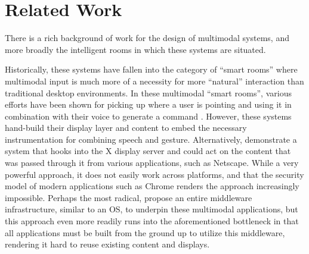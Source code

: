 \section{Related Work}

There is a rich background of work for the design of multimodal systems, and more broadly the intelligent rooms
in which these systems are situated.

Historically, these systems have fallen into the category of ``smart rooms''
where multimodal input is much more of a necessity for more ``natural''
interaction than traditional desktop environments. In these multimodal
``smart rooms'', various efforts have been shown for picking up
where a user is pointing and using it in combination with
their voice to generate a command
\cite{bolt_put-that-there:_1980,carbini_wizard_2006,langner_multiple_2019,farrell_symbiotic_2016,kephart2018cognitive}.
However, these systems hand-build their display layer and
content to embed the necessary instrumentation for combining speech
and gesture. Alternatively, \cite{coen_design_1998,brooks_intelligent_1997} demonstrate a system that
hooks into the X display server and could act on the content that was passed through
it from various applications, such as Netscape. While a very powerful approach, it
does not easily work across platforms, and that the security model of modern
applications such as Chrome renders the approach
increasingly impossible. Perhaps the most radical, \cite{roman_middleware_2002} propose an entire middleware infrastructure, similar to an OS,
to underpin these multimodal applications, but this approach
even more readily runs into the aforementioned bottleneck
in that all applications must be built from the ground up to
utilize this middleware, rendering it hard to reuse existing
content and displays.
